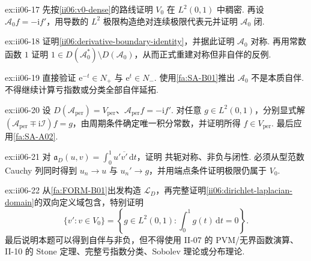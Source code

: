 \begin{FAExercise}[零边界绝对连续域与最小导数闭性]{ex:ii06-17}
先按\autoref{ii06:v0-dense}的路线证明 \(\displaystyle V_0\) 在 \(\displaystyle L^2(0,1)\) 中稠密. 再设 \(\displaystyle\mathcal A_0f=-\mathrm{i}f'\)，用导数的 \(\displaystyle L^2\) 极限构造绝对连续极限代表元并证明 \(\displaystyle\mathcal A_0\) 闭.
\end{FAExercise}

\begin{FAExercise}[边界恒等式与对称但非自伴的反例]{ex:ii06-18}
证明\autoref{ii06:derivative-boundary-identity}，并据此证明 \(\displaystyle\mathcal A_0\) 对称. 再用常数函数 \(\displaystyle1\) 证明 \(\displaystyle1\in D(\mathcal A_0^*)\setminus D(\mathcal A_0)\)，从而正式重建对称但非自伴的反例.
\end{FAExercise}

\begin{FAExercise}[两个非零亏向量]{ex:ii06-19}
直接验证 \(\displaystyle\mathrm{e}^{-t}\in N_+\) 与 \(\displaystyle\mathrm{e}^{t}\in N_-\). 使用\autoref{fa:SA-B01}推出 \(\displaystyle\mathcal A_0\) 不是本质自伴. 不得继续计算亏指数或分类全部自伴延拓.
\end{FAExercise}

\begin{FAExercise}{ex:ii06-20}
设 \(\displaystyle D(\mathcal A_{\mathrm{per}})=V_{\mathrm{per}}\)、\(\displaystyle\mathcal A_{\mathrm{per}}f=-\mathrm{i}f'\). 对任意 \(\displaystyle g\in L^2(0,1)\)，分别显式解 \(\displaystyle(\mathcal A_{\mathrm{per}}\mp\mathrm{i}\mathcal I)f=g\)，由周期条件确定唯一积分常数，并证明所得 \(\displaystyle f\in V_{\mathrm{per}}\). 最后应用\autoref{fa:SA-A02}.
\end{FAExercise}

\begin{FAExercise}{ex:ii06-21}
对 \(\displaystyle\mathfrak a_D(u,v)=\int_0^1u'\overline{v'}\,\mathrm{d}t\)，证明 共轭对称、非负与闭性. 必须从型范数 Cauchy 列同时得到 \(\displaystyle u_n\to u\) 与 \(\displaystyle u_n'\to g\)，并用端点条件证明极限仍属于 \(\displaystyle V_0\).
\end{FAExercise}

\begin{FAExercise}{ex:ii06-22}
从\autoref{fa:FORM-B01}出发构造 \(\displaystyle\mathcal L_D\)，再完整证明\autoref{ii06:dirichlet-laplacian-domain}的双向定义域包含，特别证明
\[
\{v':v\in V_0\}
=
\left\{g\in L^2(0,1):\int_0^1g(t)\,\mathrm{d}t=0\right\}.
\]
最后说明本题可以得到自伴与非负，但不得使用 II-07 的 PVM/无界函数演算、II-10 的 Stone 定理、完整亏指数分类、Sobolev 理论或分布理论.
\end{FAExercise}
